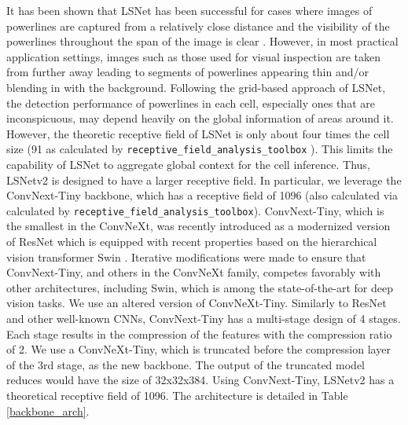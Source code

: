 \documentclass[journal]{IEEEtran}
\newcommand{\commentM}[1]{\textbf{\textcolor{blue}{M: #1}}}
\begin{document}

It has been shown that LSNet has been successful for cases where images of powerlines are captured from a relatively close distance and the visibility of the powerlines throughout the span of the image is clear \cite{Nguyen2020}. However, in most practical application settings, images such as those used for visual inspection are taken from further away leading to segments of powerlines appearing thin and/or blending in with the background. Following the grid-based approach of LSNet, the detection performance of powerlines in each cell, especially ones that are inconspicuous, may depend heavily on the global information of areas around it. However, the theoretic receptive field of LSNet is only about four times the cell size (91 as calculated by \texttt{receptive\_field\_analysis\_toolbox} \cite{receptive_field_analysis_toolbox}). This limits the capability of LSNet to aggregate global context for the cell inference.  Thus, LSNetv2 is designed to have a larger receptive field. In particular, we leverage the ConvNext-Tiny backbone, which has a receptive field of 1096 (also calculated via calculated by \texttt{receptive\_field\_analysis\_toolbox}). ConvNext-Tiny, which is the smallest in the ConvNeXt, was recently introduced as a modernized version of ResNet \cite{resnet} which is equipped with recent properties based on the hierarchical vision transformer Swin \cite{swin}. Iterative modifications were made to ensure that ConvNext-Tiny, and others in the ConvNeXt family, competes favorably with other architectures, including Swin, which is among the state-of-the-art for deep vision tasks. We use an altered version of ConvNeXt-Tiny. Similarly to ResNet and other well-known CNNs, ConvNext-Tiny has a multi-stage design of 4 stages. Each stage results in the compression of the features with the compression ratio of 2. We use a ConvNeXt-Tiny, which is truncated before the compression layer of the 3rd stage, as the new backbone. The output of the truncated model reduces would have the size of 32x32x384. Using ConvNext-Tiny, LSNetv2 has a theoretical receptive field of 1096. The architecture is detailed in Table \ref{backbone_arch}.
\end{document}
